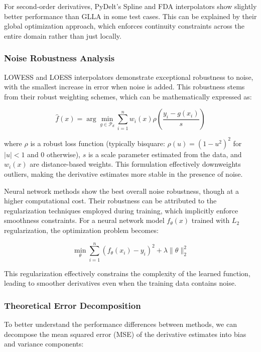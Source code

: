 \documentclass[10pt,journal,compsoc]{IEEEtran}
\begin{document}
For second-order derivatives, PyDelt's Spline and FDA interpolators show slightly better performance than GLLA in some test cases. This can be explained by their global optimization approach, which enforces continuity constraints across the entire domain rather than just locally.

\subsubsection{Noise Robustness Analysis}

LOWESS and LOESS interpolators demonstrate exceptional robustness to noise, with the smallest increase in error when noise is added. This robustness stems from their robust weighting schemes, which can be mathematically expressed as:

\begin{equation}
    \hat{f}(x) = \arg\min_{g \in \mathcal{P}_d} \sum_{i=1}^{n} w_i(x) \rho\left(\frac{y_i - g(x_i)}{s}\right)
\end{equation}

where $\rho$ is a robust loss function (typically bisquare: $\rho(u) = (1-u^2)^2$ for $|u| < 1$ and 0 otherwise), $s$ is a scale parameter estimated from the data, and $w_i(x)$ are distance-based weights. This formulation effectively downweights outliers, making the derivative estimates more stable in the presence of noise.

Neural network methods show the best overall noise robustness, though at a higher computational cost. Their robustness can be attributed to the regularization techniques employed during training, which implicitly enforce smoothness constraints. For a neural network model $f_{\theta}(x)$ trained with $L_2$ regularization, the optimization problem becomes:

\begin{equation}
    \min_{\theta} \sum_{i=1}^{n} \left(f_{\theta}(x_i) - y_i\right)^2 + \lambda \|\theta\|_2^2
\end{equation}

This regularization effectively constrains the complexity of the learned function, leading to smoother derivatives even when the training data contains noise.

\subsubsection{Theoretical Error Decomposition}

To better understand the performance differences between methods, we can decompose the mean squared error (MSE) of the derivative estimates into bias and variance components:
\end{document}
